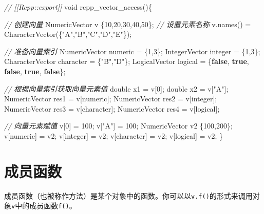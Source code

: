 \documentclass[]{ctexbook}
\newenvironment{Shaded}{\begin{snugshade}}{\end{snugshade}}
\newcommand{\KeywordTok}[1]{\textcolor[rgb]{0.13,0.29,0.53}{\textbf{#1}}}
\newcommand{\DataTypeTok}[1]{\textcolor[rgb]{0.13,0.29,0.53}{#1}}
\newcommand{\DecValTok}[1]{\textcolor[rgb]{0.00,0.00,0.81}{#1}}
\newcommand{\StringTok}[1]{\textcolor[rgb]{0.31,0.60,0.02}{#1}}
\newcommand{\CommentTok}[1]{\textcolor[rgb]{0.56,0.35,0.01}{\textit{#1}}}
\newcommand{\NormalTok}[1]{#1}
\begin{document}
\begin{Shaded}
\begin{Highlighting}[]
\CommentTok{// [[Rcpp::export]]}
\DataTypeTok{void}\NormalTok{ rcpp_vector_access()\{}

  \CommentTok{// 创建向量}
\NormalTok{  NumericVector v  \{}\DecValTok{10}\NormalTok{,}\DecValTok{20}\NormalTok{,}\DecValTok{30}\NormalTok{,}\DecValTok{40}\NormalTok{,}\DecValTok{50}\NormalTok{\};}
  \CommentTok{// 设置元素名称}
\NormalTok{  v.names() = CharacterVector(\{}\StringTok{"A"}\NormalTok{,}\StringTok{"B"}\NormalTok{,}\StringTok{"C"}\NormalTok{,}\StringTok{"D"}\NormalTok{,}\StringTok{"E"}\NormalTok{\});}
  
  \CommentTok{// 准备向量索引}
\NormalTok{  NumericVector   numeric = \{}\DecValTok{1}\NormalTok{,}\DecValTok{3}\NormalTok{\};}
\NormalTok{  IntegerVector   integer = \{}\DecValTok{1}\NormalTok{,}\DecValTok{3}\NormalTok{\};}
\NormalTok{  CharacterVector character = \{}\StringTok{"B"}\NormalTok{,}\StringTok{"D"}\NormalTok{\};}
\NormalTok{  LogicalVector   logical = \{}\KeywordTok{false}\NormalTok{, }\KeywordTok{true}\NormalTok{, }\KeywordTok{false}\NormalTok{, }\KeywordTok{true}\NormalTok{, }\KeywordTok{false}\NormalTok{\};}
  
  \CommentTok{// 根据向量索引获取向量元素值}
  \DataTypeTok{double}\NormalTok{ x1 = v[}\DecValTok{0}\NormalTok{];}
  \DataTypeTok{double}\NormalTok{ x2 = v[}\StringTok{"A"}\NormalTok{];}
\NormalTok{  NumericVector res1 = v[numeric];}
\NormalTok{  NumericVector res2 = v[integer];}
\NormalTok{  NumericVector res3 = v[character];}
\NormalTok{  NumericVector res4 = v[logical];}
  
  \CommentTok{// 向量元素赋值}
\NormalTok{  v[}\DecValTok{0}\NormalTok{]   = }\DecValTok{100}\NormalTok{;}
\NormalTok{  v[}\StringTok{"A"}\NormalTok{] = }\DecValTok{100}\NormalTok{;}
\NormalTok{  NumericVector v2 \{}\DecValTok{100}\NormalTok{,}\DecValTok{200}\NormalTok{\};}
\NormalTok{  v[numeric]   = v2;}
\NormalTok{  v[integer]   = v2;}
\NormalTok{  v[character] = v2;}
\NormalTok{  v[logical]   = v2;}
\NormalTok{\}}
\end{Highlighting}
\end{Shaded}

\section{成员函数}\label{Member-functions}

成员函数（也被称作方法）是某个对象中的函数。你可以以\texttt{v.f()}的形式来调用对象\texttt{v}中的成员函数\texttt{f()}。
\end{document}

